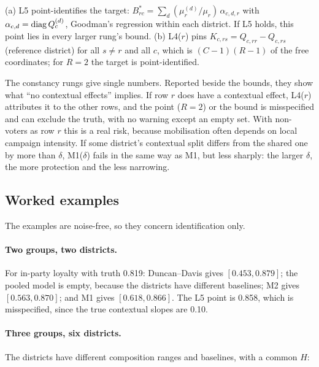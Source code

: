 \begin{proposition}\label{prop:D7}
(a) L5 point-identifies the target:
$B^*_{rc}=\sum_d(\mu^{(d)}_r/\mu_r)\,\alpha_{c,d,r}$ with $\alpha_{c,d}=\operatorname{diag} Q^{(d)}_c$,
Goodman's regression within each district. If L5 holds, this point lies in every
larger rung's bound. (b) L4($r$) pins $K_{c,rs}=Q_{c,rr}-Q_{c,rs}$ (reference
district) for all $s\ne r$ and all $c$, which is $(C-1)(R-1)$ of the free
coordinates; for $R=2$ the target is point-identified.
\end{proposition}
\begin{reading}
The constancy rungs give single numbers. Reported beside the bounds, they show
what ``no contextual effects'' implies. If row $r$ does have a contextual effect,
L4($r$) attributes it to the other rows, and the point ($R=2$) or the bound is
misspecified and can exclude the truth, with no warning except an empty set.
With non-voters as row $r$ this is a real risk, because mobilisation often
depends on local campaign intensity. If some district's contextual split differs
from the shared one by more than $\delta$, M1($\delta$) fails in the same way as
M1, but less sharply: the larger $\delta$, the more protection and the less
narrowing.
\end{reading}

\subsection{Worked examples}\label{sec:ladder-examples}

The examples are noise-free, so they concern identification only.

\paragraph{Two groups, two districts.} For in-party loyalty with truth 0.819:
Duncan--Davis gives $[0.453,0.879]$; the pooled model is empty, because the
districts have different baselines; M2 gives $[0.563,0.870]$; and M1 gives
$[0.618,0.866]$. The L5 point is 0.858, which is misspecified, since the true
contextual slopes are 0.10.

\paragraph{Three groups, six districts.} The districts have different
composition ranges and baselines, with a common $H$:


